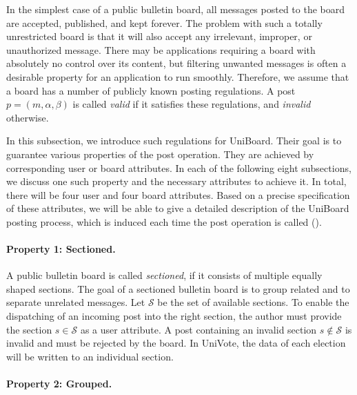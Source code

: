 \documentclass[bibtotoc,halfparskip,oneside]{scrreprt}
\begin{document}
	In the simplest case of a public bulletin board, all messages posted to the board are accepted, published, and kept forever. The problem with such a totally unrestricted board is that it will also accept any irrelevant, improper, or unauthorized message. There may be applications requiring a  board with absolutely no control over its content, but filtering unwanted messages is often a desirable property for an application to run smoothly. Therefore, we assume that a board has a number of publicly known posting regulations. A post $p=(m,\alpha,\beta)$ is called \emph{valid} if it satisfies these regulations, and \emph{invalid} otherwise.
	
	In this subsection, we introduce such regulations for UniBoard. Their goal is to guarantee various properties of the post operation. They are achieved by corresponding user or board attributes. In each of the following eight subsections, we discuss one such property and the necessary attributes to achieve it. In total, there will be four user and four board attributes. Based on a precise specification of these attributes, we will be able to give a detailed description of the UniBoard posting process, which is induced each time the post operation is called ().
	
	\paragraph*{Property 1: Sectioned.}
	
	A public bulletin board is called \emph{sectioned}, if it consists of multiple equally shaped sections. The goal of a sectioned bulletin board is to group related and to separate unrelated messages. Let $\mathcal{S}$ be the set of available sections. To enable the dispatching of an incoming post into the right section, the author must provide the section $s\in\mathcal{S}$ as a user attribute. A post containing an invalid section $s\not\in\mathcal{S}$ is invalid and must be rejected by the board. In UniVote, the data of each election will be written to an individual section.
	
	\paragraph*{Property 2: Grouped.}
	
\end{document}
